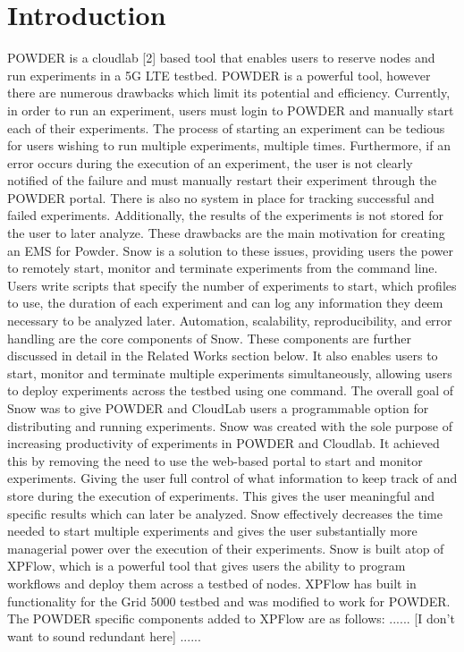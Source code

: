 \documentclass[11pt,twocolumn,letterpaper]{article}
\begin{document}
\section{Introduction}
\qquad POWDER is a cloudlab [2] based tool that enables users to reserve nodes and run experiments in a 5G LTE testbed. POWDER is a powerful tool, however there are numerous drawbacks which limit its potential and efficiency. Currently, in order to run an experiment, users must login to POWDER and manually start each of their experiments.  The process of starting an experiment can be tedious for users wishing to run multiple experiments, multiple times.  Furthermore, if an error occurs during the execution of an experiment, the user is not clearly notified of the failure and must manually restart their experiment through the POWDER portal.  There is also no system in place for tracking successful and failed experiments.  Additionally, the results of the experiments is not stored for the user to later analyze.  These drawbacks are the main motivation for creating an EMS for Powder.  \newline
\qquad Snow is a solution to these issues, providing users the power to remotely start, monitor and terminate experiments from the command line.  Users write scripts that specify the number of experiments to start, which profiles to use, the duration of each experiment and can log any information they deem necessary to be analyzed later.  Automation, scalability, reproducibility, and error handling are the core components of Snow. These components are further discussed in detail in the Related Works section below. It also enables users to start, monitor and terminate multiple experiments simultaneously, allowing users to deploy experiments across the testbed using one command.  \newline
\qquad The overall goal of Snow was to give POWDER and CloudLab users a programmable option for distributing and running experiments.  Snow was created with the sole purpose of increasing productivity of experiments in POWDER and Cloudlab.  It achieved this by removing the need to use the web-based portal to start and monitor experiments.  Giving the user full control of what information to keep track of and store during the execution of experiments.  This gives the user meaningful and specific results which can later be analyzed.  Snow effectively decreases the time needed to start multiple experiments and gives the user substantially more managerial power over the execution of their experiments.\newline
\qquad Snow is built atop of XPFlow, which is a powerful tool that gives users the ability to program workflows and deploy them across a testbed of nodes.  XPFlow has built in functionality for the Grid 5000 testbed and was modified to work for POWDER.  The POWDER specific components added to XPFlow are as follows: ...... [I don't want to sound redundant here] ...... 
\end{document}
